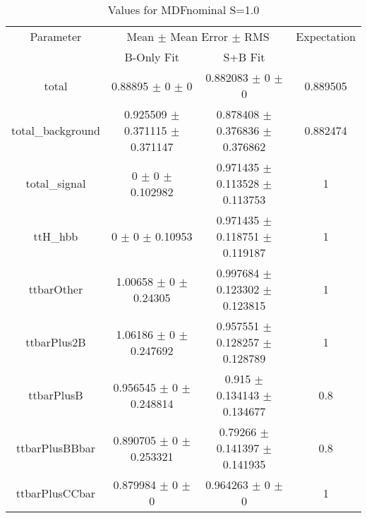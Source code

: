\begin{table}
\centering
\caption{Values for MDFnominal S=1.0}
\begin{tabular}{cccc}
\toprule
Parameter & \multicolumn{2}{c}{Mean $\pm$ Mean Error $\pm$ RMS} & Expectation\\
 & B-Only Fit & S+B Fit & \\
\midrule
total & \num{0.88895} $\pm$ \num{0} $\pm$ \num{0} & \num{0.882083} $\pm$ \num{0} $\pm$ \num{0} & \num{0.889505}\\
total\_background & \num{0.925509} $\pm$ \num{0.371115} $\pm$ \num{0.371147} & \num{0.878408} $\pm$ \num{0.376836} $\pm$ \num{0.376862} & \num{0.882474}\\
total\_signal & \num{0} $\pm$ \num{0} $\pm$ \num{0.102982} & \num{0.971435} $\pm$ \num{0.113528} $\pm$ \num{0.113753} & \num{1}\\
ttH\_hbb & \num{0} $\pm$ \num{0} $\pm$ \num{0.10953} & \num{0.971435} $\pm$ \num{0.118751} $\pm$ \num{0.119187} & \num{1}\\
ttbarOther & \num{1.00658} $\pm$ \num{0} $\pm$ \num{0.24305} & \num{0.997684} $\pm$ \num{0.123302} $\pm$ \num{0.123815} & \num{1}\\
ttbarPlus2B & \num{1.06186} $\pm$ \num{0} $\pm$ \num{0.247692} & \num{0.957551} $\pm$ \num{0.128257} $\pm$ \num{0.128789} & \num{1}\\
ttbarPlusB & \num{0.956545} $\pm$ \num{0} $\pm$ \num{0.248814} & \num{0.915} $\pm$ \num{0.134143} $\pm$ \num{0.134677} & \num{0.8}\\
ttbarPlusBBbar & \num{0.890705} $\pm$ \num{0} $\pm$ \num{0.253321} & \num{0.79266} $\pm$ \num{0.141397} $\pm$ \num{0.141935} & \num{0.8}\\
ttbarPlusCCbar & \num{0.879984} $\pm$ \num{0} $\pm$ \num{0} & \num{0.964263} $\pm$ \num{0} $\pm$ \num{0} & \num{1}\\
\bottomrule
\end{tabular}
\end{table}